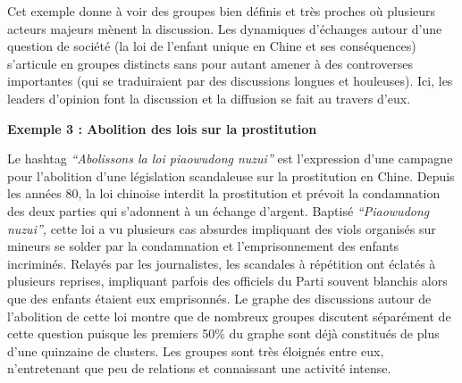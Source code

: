 Cet exemple donne à voir des groupes bien définis et très proches o\`u plusieurs acteurs majeurs mènent la discussion. Les dynamiques d{\textquoteright}échanges autour d{\textquoteright}une question de société (la loi de l{\textquoteright}enfant unique en Chine et ses conséquences) s{\textquoteright}articule en groupes distincts sans pour autant amener à des controverses importantes (qui se traduiraient par des discussions longues et houleuses). Ici, les leaders d{\textquoteright}opinion font la discussion et la diffusion se fait au travers d{\textquoteright}eux.

\clearpage
\textbf{Exemple 3 : Abolition des lois sur la prostitution}

Le hashtag \textit{{\textquotedblleft}Abolissons la loi piaowudong nuzui{\textquotedblright} }est l{\textquoteright}expression d{\textquoteright}une campagne pour l{\textquoteright}abolition d{\textquoteright}une législation scandaleuse sur la prostitution en Chine. Depuis les années 80, la loi chinoise interdit la prostitution et prévoit la condamnation des deux parties qui s{\textquoteright}adonnent à un échange d{\textquoteright}argent. Baptisé \textit{{\textquotedblleft}Piaowudong nuzui{\textquotedblright}, }cette loi a vu plusieurs cas absurdes impliquant des viols organisés sur mineurs se solder par la condamnation et l{\textquoteright}emprisonnement des enfants incriminés. Relayés par les journalistes, les scandales à répétition ont éclatés à plusieurs reprises, impliquant parfois des officiels du Parti souvent blanchis alors que des enfants étaient eux emprisonnés. Le graphe des discussions autour de l{\textquoteright}abolition de cette loi montre que de nombreux groupes discutent séparément de cette question puisque les premiers 50\% du graphe sont déjà constitués de plus d{\textquoteright}une quinzaine de clusters. Les groupes sont très éloignés entre eux, n{\textquoteright}entretenant que peu de relations et connaissant une activité intense.

